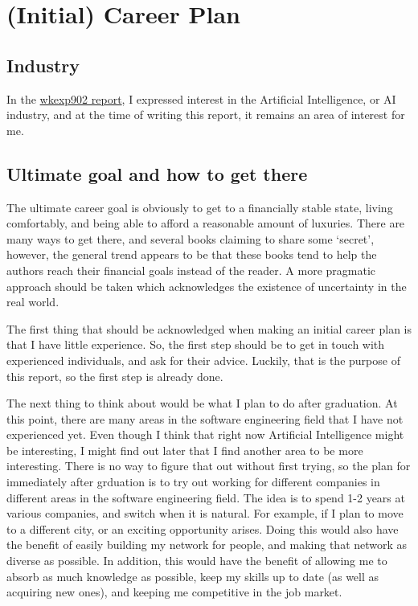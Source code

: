 \section{(Initial) Career Plan}

\subsection{Industry}
In the
\href{https://github.com/Arunscape/LaTeX-Stuff/blob/a732f319e8a6526f036bd424fa24f66941f09a5a/Work-Term-Reports/wkexp902/report.pdf}{wkexp902
report}, 
I expressed interest in the Artificial Intelligence, or AI industry, and at the
time of writing this report, it remains an area of interest for me. 


\subsection{Ultimate goal and how to get there} 
The ultimate career goal is obviously to get to a financially stable state,
living comfortably, and being able to afford a reasonable amount of luxuries.
There are many ways to get there, and several books claiming to share some
`secret', however, the general trend appears to be that these books tend to help
the authors reach their financial goals instead of the reader. A more pragmatic
approach should be taken which acknowledges the existence of uncertainty in the
real world. 

The first thing that should be acknowledged when making an initial career plan
is that I have little experience. So, the first step should be to get in touch
with experienced individuals, and ask for their advice. Luckily, that is the
purpose of this report, so the first step is already done.

The next thing to think about would be what I plan to do after graduation.
At this point, there are many areas in the software engineering field that I 
have not experienced yet. Even though I think that right now Artificial
Intelligence might be interesting, I might find out later that I find another
area to be more interesting. There is no way to figure that out without first
trying, so the plan for immediately after grduation is to try out working for
different companies in different areas in the software engineering field. 
The idea is to spend 1-2 years at various companies, and switch when it is
natural. For example, if I plan to move to a different city, or an exciting
opportunity arises. Doing this would also have the benefit of easily building
my network for people, and making that network as diverse as possible. In 
addition, this would have the benefit of allowing me to absorb as much knowledge
as possible, keep my skills up to date (as well as acquiring new ones), and
keeping me competitive in the job market. 

